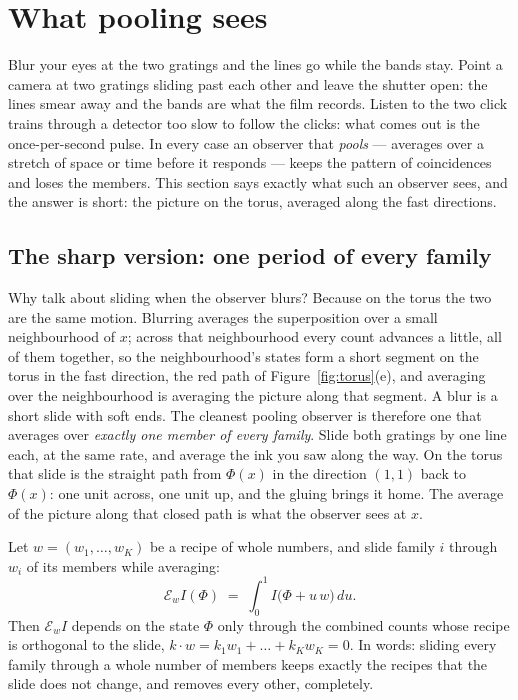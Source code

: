 \section{What pooling sees}
\label{sec:pooling}

Blur your eyes at the two gratings and the lines go while the bands stay.
Point a camera at two gratings sliding past each other and leave the shutter
open: the lines smear away and the bands are what the film records. Listen
to the two click trains through a detector too slow to follow the clicks:
what comes out is the once-per-second pulse. In every case an observer that
\emph{pools} --- averages over a stretch of space or time before it responds
--- keeps the pattern of coincidences and loses the members. This section
says exactly what such an observer sees, and the answer is short: the
picture on the torus, averaged along the fast directions.

\subsection{The sharp version: one period of every family}
\label{sec:sweep}

Why talk about sliding when the observer blurs? Because on the torus the two
are the same motion. Blurring averages the superposition over a small
neighbourhood of $x$; across that neighbourhood every count advances a
little, all of them together, so the neighbourhood's states form a short
segment on the torus in the fast direction, the red path of
Figure~\ref{fig:torus}(e), and averaging over the neighbourhood is averaging
the picture along that segment. A blur is a short slide with soft ends.
The cleanest pooling observer is therefore one that averages over
\emph{exactly one member of every family}. Slide both gratings by one line
each, at the same rate, and average the ink you saw along the way. On the
torus that slide is the straight path from $\Phi(x)$ in the direction
$(1,1)$ back to $\Phi(x)$: one unit across, one unit up, and the gluing
brings it home. The average of the picture along that closed path is what
the observer sees at $x$.

\begin{theorem}
\label{thm:sweep}
Let $w=(w_1,\dots,w_K)$ be a recipe of whole numbers, and slide family $i$
through $w_i$ of its members while averaging:
\[
  \mathcal E_w I(\Phi)\;=\;\int_0^1 I\big(\Phi+u\,w\big)\,du .
\]
Then $\mathcal E_w I$ depends on the state $\Phi$ only through the combined
counts whose recipe is orthogonal to the slide,
$k\cdot w=k_1w_1+\dots+k_Kw_K=0$. In words: sliding every family through a
whole number of members keeps exactly the recipes that the slide does not
change, and removes every other, completely.
\end{theorem}

